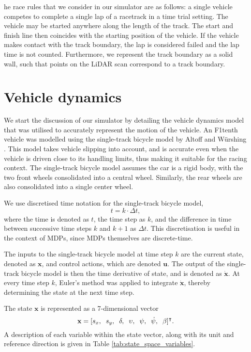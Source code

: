 he race rules that we consider in our simulator are as follows: a single vehicle competes to complete a single lap of a racetrack in a time trial setting.
The vehicle may be started anywhere along the length of the track.
The start and finish line then coincides with the starting position of the vehicle.
If the vehicle makes contact with the track boundary, the lap is considered failed and the lap time is not counted.
Furthermore, we represent the track boundary as a solid wall, such that points on the LiDAR scan correspond to a track boundary.


\section{Vehicle dynamics}\label{sec:sim_vehicle_dynamics}

We start the discussion of our simulator by detailing the vehicle dynamics model that was utilised to accurately represent the motion of the vehicle.
An F1tenth vehicle was modelled using the single-track bicycle model by  Altoff and  W\"{u}rshing \cite{Althoff2020}.
This model takes vehicle slipping into account, and is accurate even when the vehicle is driven close to its handling limits, thus making it suitable for the racing context.
The single-track bicycle model assumes the car is a rigid body, with the two front wheels consolidated into a central wheel. 
Similarly, the rear wheels are also consolidated into a single center wheel. 


We use discretised time notation for the single-track bicycle model, 
\begin{equation}
    t = k \cdot \Delta t,
\end{equation}
where the time is denoted as $t$, the time step as $k$, and the difference in time between successive time steps $k$ and $k+1$ as $\Delta t$. 
This discretisation is useful in the context of MDPs, since MDPs themselves are discrete-time.


The inputs to the single-track bicycle model at time step $k$ are the current state, denoted as $\mathbf{x}$, and control actions, which are denoted $\mathbf{u}$.
The output of the single-track bicycle model is then the time derivative of state, and is denoted as $\mathbf{\dot{x}}$.
At every time step $k$, Euler's method was applied to integrate $\mathbf{\dot{x}}$, thereby determining the state at the next time step.


The state $\mathbf{x}$ is represented as a 7-dimensional vector
\begin{equation}
    \mathbf{x} = [s_x, \hspace{0.2cm} s_y, \hspace{0.2cm} \delta, \hspace{0.2cm} \upsilon, \hspace{0.2cm} \psi, \hspace{0.2cm} \dot{\psi}, \hspace{0.2cm} \beta]^\intercal .
\end{equation}
A description of each variable within the state vector, along with its unit and reference direction is given in Table \ref{tab:state_space_variables}.


